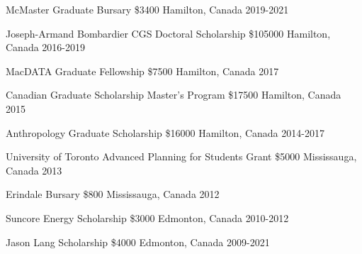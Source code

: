 \begin{cvhonors}


    \cvhonor
        {McMaster Graduate Bursary} %
        {\$3400} %
        {Hamilton, Canada} %
        {2019-2021} %

    \cvhonor
        {Joseph-Armand Bombardier CGS Doctoral Scholarship} %
        {\$105000} %
        {Hamilton, Canada} %
        {2016-2019} %

    \cvhonor
        {MacDATA Graduate Fellowship} %
        {\$7500} %
        {Hamilton, Canada} %
        {2017} %

    \cvhonor
        {Canadian Graduate Scholarship Master's Program} %
        {\$17500} %
        {Hamilton, Canada} %
        {2015} %

    \cvhonor
        {Anthropology Graduate Scholarship} %
        {\$16000} %
        {Hamilton, Canada} %
        {2014-2017} %

    \cvhonor
        {University of Toronto Advanced Planning for Students Grant} %
        {\$5000} %
        {Mississauga, Canada} %
        {2013} %

    \cvhonor
        {Erindale Bursary} %
        {\$800} %
        {Mississauga, Canada} %
        {2012} %

    \cvhonor
        {Suncore Energy Scholarship} %
        {\$3000} %
        {Edmonton, Canada} %
        {2010-2012} %

    \cvhonor
        {Jason Lang Scholarship} %
        {\$4000} %
        {Edmonton, Canada} %
        {2009-2021} %

\end{cvhonors}


